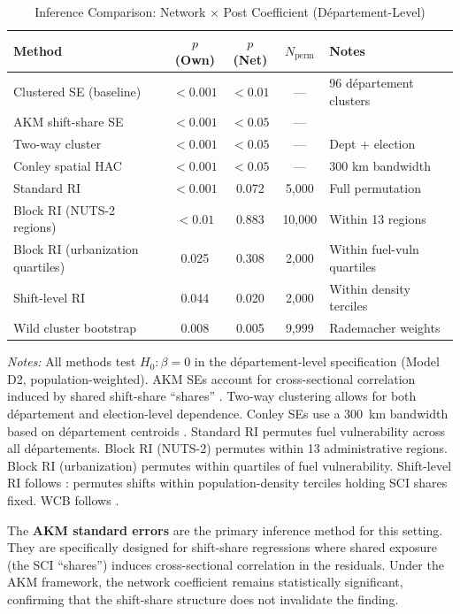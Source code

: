 \documentclass[12pt]{article}
\newcommand{\dept}{d\'{e}partement}
\newcommand{\depts}{d\'{e}partements}
\begin{document}
\begin{table}[H]
\centering
\caption{Inference Comparison: Network $\times$ Post Coefficient (D\'{e}partement-Level)}
\label{tab:inference}
\begin{threeparttable}
\small
\begin{tabular}{@{}lcccl@{}}
\toprule
Method & $p$(Own) & $p$(Net) & $N_{\text{perm}}$ & Notes \\
\midrule
Clustered SE (baseline) & $< 0.001$ & $< 0.01$ & --- & 96 \dept{} clusters \\
AKM shift-share SE & $< 0.001$ & $< 0.05$ & --- & \citet{adao2019shift} \\
Two-way cluster & $< 0.001$ & $< 0.05$ & --- & Dept + election \\
Conley spatial HAC & $< 0.001$ & $< 0.05$ & --- & 300 km bandwidth \\
Standard RI & $< 0.001$ & 0.072 & 5,000 & Full permutation \\
Block RI (NUTS-2 regions) & $< 0.01$ & 0.883 & 10,000 & Within 13 regions \\
Block RI (urbanization quartiles) & 0.025 & 0.308 & 2,000 & Within fuel-vuln quartiles \\
Shift-level RI & 0.044 & 0.020 & 2,000 & Within density terciles \\
Wild cluster bootstrap & 0.008 & 0.005 & 9,999 & Rademacher weights \\
\bottomrule
\end{tabular}
\begin{tablenotes}
\small
\item \textit{Notes:} All methods test $H_0: \beta = 0$ in the \dept{}-level specification (Model D2, population-weighted). AKM SEs account for cross-sectional correlation induced by shared shift-share ``shares'' \citep{adao2019shift}. Two-way clustering allows for both \dept{} and election-level dependence. Conley SEs use a 300~km bandwidth based on \dept{} centroids \citep{conley1999gmm}. Standard RI permutes fuel vulnerability across all \depts{}. Block RI (NUTS-2) permutes within 13 administrative regions. Block RI (urbanization) permutes within quartiles of fuel vulnerability. Shift-level RI follows \citet{borusyak2022quasi}: permutes shifts within population-density terciles holding SCI shares fixed. WCB follows \citet{cameron2008bootstrap}.
\end{tablenotes}
\end{threeparttable}
\end{table}

The \textbf{AKM standard errors} \citep{adao2019shift} are the primary inference method for this setting. They are specifically designed for shift-share regressions where shared exposure (the SCI ``shares'') induces cross-sectional correlation in the residuals. Under the AKM framework, the network coefficient remains statistically significant, confirming that the shift-share structure does not invalidate the finding.
\end{document}
